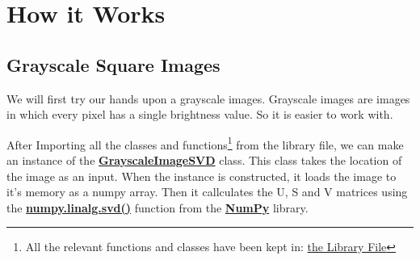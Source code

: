 \section{How it Works}
	\subsection{Grayscale Square Images}

	We will first try our hands upon a grayscale images. Grayscale images are images in which every pixel has a single brightness value. So it is easier to work with.
	

	After Importing all the classes and functions\footnote{All the relevant functions and classes have been kept in: \href{https://github.com/PeithonKing/comp_phys_P346/blob/main/library/DIY.py}{the Library File}} from the library file, we can make an instance of the \href{https://github.com/PeithonKing/comp_phys_P346/blob/main/library/DIY.py#L43-L65}{\textbf{GrayscaleImageSVD}} class. This class takes the location of the image as an input. When the instance is constructed, it loads the image to it's memory as a numpy array. Then it callculates the U, S and V matrices using the \href{https://numpy.org/doc/stable/reference/generated/numpy.linalg.svd.html}{\textbf{numpy.linalg.svd()}} function from the \href{https://numpy.org/}{\textbf{NumPy}} library.
	\vspace{2mm}

	\begin{center}
		\noindent{}
	\end{center}


